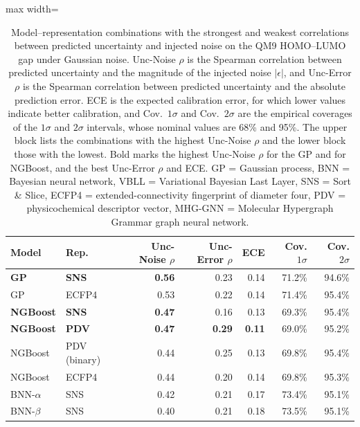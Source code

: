 \begin{table}[htbp]
\centering
\caption[Strongest and weakest uncertainty--noise correlations on QM9.]{Model--representation combinations with the strongest and weakest correlations between predicted uncertainty and injected noise on the QM9 HOMO--LUMO gap under Gaussian noise. Unc-Noise $\rho$ is the Spearman correlation between predicted uncertainty and the magnitude of the injected noise $|\epsilon|$, and Unc-Error $\rho$ is the Spearman correlation between predicted uncertainty and the absolute prediction error. ECE is the expected calibration error, for which lower values indicate better calibration, and Cov.\ $1\sigma$ and Cov.\ $2\sigma$ are the empirical coverages of the $1\sigma$ and $2\sigma$ intervals, whose nominal values are 68\% and 95\%. The upper block lists the combinations with the highest Unc-Noise $\rho$ and the lower block those with the lowest. Bold marks the highest Unc-Noise $\rho$ for the GP and for NGBoost, and the best Unc-Error $\rho$ and ECE. GP = Gaussian process, BNN = Bayesian neural network, VBLL = Variational Bayesian Last Layer, SNS = Sort \& Slice, ECFP4 = extended-connectivity fingerprint of diameter four, PDV = physicochemical descriptor vector, MHG-GNN = Molecular Hypergraph Grammar graph neural network.}
\label{tab:top_unc_noise}
\small
\begin{adjustbox}{max width=\textwidth}
\begin{tabular}{llrrrrr}
\toprule
\textbf{Model} & \textbf{Rep.} & \textbf{Unc-Noise $\rho$} & \textbf{Unc-Error $\rho$} & \textbf{ECE} & \textbf{Cov. $1\sigma$} & \textbf{Cov. $2\sigma$} \\
\midrule
\textbf{GP}    & \textbf{SNS}    & \textbf{0.56} & 0.23 & 0.14 & 71.2\% & 94.6\% \\
GP             & ECFP4           & 0.53 & 0.22 & 0.14 & 71.4\% & 95.4\% \\
\textbf{NGBoost} & \textbf{SNS}  & \textbf{0.47} & 0.16 & 0.13 & 69.3\% & 95.4\% \\
\textbf{NGBoost} & \textbf{PDV}  & \textbf{0.47} & \textbf{0.29} & \textbf{0.11} & 69.0\% & 95.2\% \\
NGBoost        & PDV (binary)    & 0.44 & 0.25 & 0.13 & 69.8\% & 95.4\% \\
NGBoost        & ECFP4           & 0.44 & 0.20 & 0.14 & 69.8\% & 95.3\% \\
BNN-$\alpha$   & SNS             & 0.42 & 0.21 & 0.17 & 73.4\% & 95.1\% \\
BNN-$\beta$    & SNS             & 0.40 & 0.21 & 0.18 & 73.5\% & 95.1\% \\

\end{tabular}
\end{adjustbox}
\end{table}
